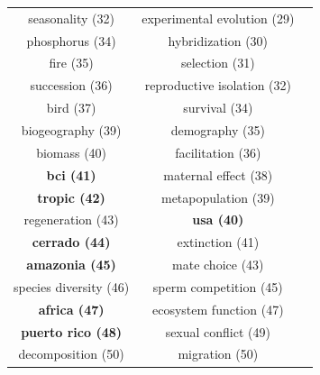 \documentclass[
  12pt,
  man, donotrepeattitle,floatsintext]{apa6}
\begin{document}
\begin{table}
{\begin{tabular}[t]{ccc}
seasonality (32) & experimental evolution (29) & \\
phosphorus (34) & hybridization (30) & \\
fire (35) & selection (31) & \\
succession (36) & reproductive isolation (32) & \\
bird (37) & survival (34) & \\
biogeography (39) & demography (35) & \\
biomass (40) & facilitation (36) & \\
\textbf{bci (41)} & maternal effect (38) & \\
\textbf{tropic (42)} & metapopulation (39) & \\
regeneration (43) & \textbf{usa (40)} & \\
\textbf{cerrado (44)} & extinction (41) & \\
\textbf{amazonia (45)} & mate choice (43) & \\
species diversity (46) & sperm competition (45) & \\
\textbf{africa (47)} & ecosystem function (47) & \\
\textbf{puerto rico (48)} & sexual conflict (49) & \\
decomposition (50) & migration (50) & \\
\bottomrule
\end{tabular}}
\end{table}

\newpage
\end{document}
